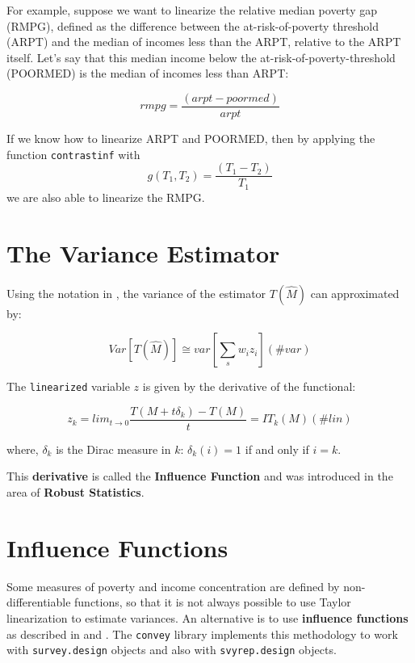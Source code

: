 \documentclass[
]{book}
\begin{document}
For example, suppose we want to linearize the relative median poverty gap (RMPG), defined as the difference between the at-risk-of-poverty threshold (ARPT) and the median of incomes less than the ARPT, relative to the ARPT itself. Let's say that this median income below the at-risk-of-poverty-threshold (POORMED) is the median of incomes less than ARPT:

\[
rmpg= \frac{(arpt-poormed)} {arpt}
\]

If we know how to linearize ARPT and POORMED, then by applying the function \texttt{contrastinf} with
\[
g(T_1,T_2)= \frac{(T_1 - T_2)}{T_1}
\]
we are also able to linearize the RMPG.

\hypertarget{var}{%
\section{The Variance Estimator}\label{var}}

Using the notation in \textcite{osier2009}, the variance of the estimator \(T(\hat{M})\) can approximated by:

\begin{equation}
Var\left[T(\hat{M})\right]\cong var\left[\sum_s w_i z_i\right]
(\#var)
\end{equation}

The \texttt{linearized} variable \(z\) is given by the derivative of the functional:

\begin{equation}
z_k=lim_{t\rightarrow0}\frac{T(M+t\delta_k)-T(M)}{t}=IT_k(M)
(\#lin)
\end{equation}

where, \(\delta_k\) is the Dirac measure in \(k\): \(\delta_k(i)=1\) if and only if \(i=k\).

This \textbf{derivative} is called the \textbf{Influence Function} and was introduced in the area of \textbf{Robust Statistics}.

\hypertarget{influence-functions}{%
\section{Influence Functions}\label{influence-functions}}

Some measures of poverty and income concentration are defined by non-differentiable functions, so that it is not always possible to use Taylor linearization to estimate variances. An alternative is to use \textbf{influence functions} as described in \textcite{deville1999} and \textcite{osier2009}. The \texttt{convey} library implements this methodology to work with \texttt{survey.design} objects and also with \texttt{svyrep.design} objects.
\end{document}
